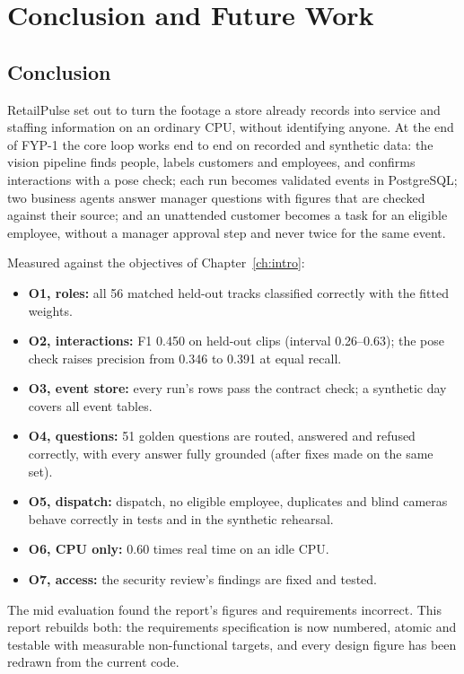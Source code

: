 \chapter{Conclusion and Future Work}
\label{ch:conclusion}

\section{Conclusion}
RetailPulse set out to turn the footage a store already records into service and staffing information on an ordinary CPU, without identifying anyone. At the end of FYP-1 the core loop works end to end on recorded and synthetic data: the vision pipeline finds people, labels customers and employees, and confirms interactions with a pose check; each run becomes validated events in PostgreSQL; two business agents answer manager questions with figures that are checked against their source; and an unattended customer becomes a task for an eligible employee, without a manager approval step and never twice for the same event.

Measured against the objectives of Chapter~\ref{ch:intro}:
\begin{itemize}
\item \textbf{O1, roles:} all 56 matched held-out tracks classified correctly with the fitted weights.
\item \textbf{O2, interactions:} F1 0.450 on held-out clips (interval 0.26--0.63); the pose check raises precision from 0.346 to 0.391 at equal recall.
\item \textbf{O3, event store:} every run's rows pass the contract check; a synthetic day covers all event tables.
\item \textbf{O4, questions:} 51 golden questions are routed, answered and refused correctly, with every answer fully grounded (after fixes made on the same set).
\item \textbf{O5, dispatch:} dispatch, no eligible employee, duplicates and blind cameras behave correctly in tests and in the synthetic rehearsal.
\item \textbf{O6, CPU only:} 0.60 times real time on an idle CPU.
\item \textbf{O7, access:} the security review's findings are fixed and tested.
\end{itemize}

The mid evaluation found the report's figures and requirements incorrect. This report rebuilds both: the requirements specification is now numbered, atomic and testable with measurable non-functional targets, and every design figure has been redrawn from the current code.

